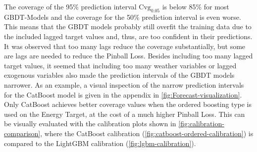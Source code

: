 \begin{table}[htp]
\centering
{}
\caption{Results of time series cross-validation on the Energy Target for the full year 2024 with weekly shifting of sliding windows. The best values are highlighted in bold.}
\label{tab:energy_results}
\end{table}
The coverage of the 95\% prediction interval $\text{Cvg}_{0.05}$ is below 85\% for most GBDT-Models and the coverage for the 50\% prediction interval is even worse. This means that the GBDT models probably still overfit the training data due to the included lagged target values and, thus, are too confident in their predictions. It was observed that too many lags reduce the coverage substantially, but some are lags are needed to reduce the Pinball Loss. Besides including too many lagged target values, it seemed that including too many weather variables or lagged exogenous variables also made the prediction intervals of the GBDT models narrower. As an example, a visual inspection of the narrow prediction intervals for the CatBoost model is given in the appendix in \cref{fig:Forecast-visualization}.
Only CatBoost achieves better coverage values when the ordered boosting type is used on the Energy
Target, at the cost of a much higher Pinball Loss. This can be visually evaluated with the calibration plots shown in \cref{fig:calibration-comparison}, where the CatBoost calibration (\cref{fig:catboost-ordered-calibration}) is compared to the LightGBM calibration (\cref{fig:lgbm-calibration}).
